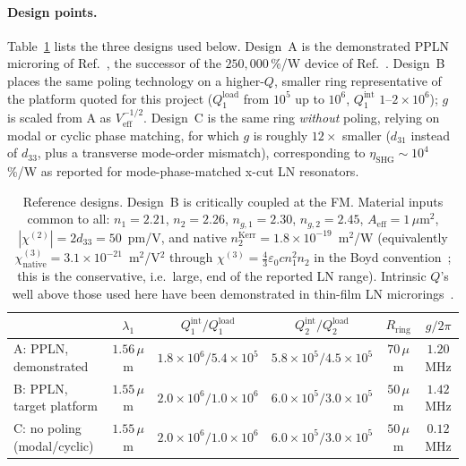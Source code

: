 \documentclass[11pt,a4paper]{article}
\newcommand{\eps}{\varepsilon}
\newcommand{\chitwo}{\chi^{(2)}}
\newcommand{\chithree}{\chi^{(3)}}
\newcommand{\Veff}{V_{\text{eff}}}
\newcommand{\Aeff}{A_{\text{eff}}}
\newcommand{\etanorm}{\eta_{\text{SHG}}}
\begin{document}
\paragraph{Design points.}  Table~\ref{tab:designs} lists the three
designs used below.  Design~A is the demonstrated PPLN microring of Ref.~\cite{Lu2020}, the
successor of the $250{,}000$\,\%/W device of Ref.~\cite{Lu2019}.  Design~B places the same poling technology on a
higher-$Q$, smaller ring representative of the platform quoted for this
project ($Q_1^{\text{load}}$ from $10^5$ up to $10^6$, $Q_1^{\text{int}}$
$1$--$2\times10^6$); $g$ is scaled from A as $\Veff^{-1/2}$.  Design~C is
the same ring \emph{without} poling, relying on modal or cyclic phase
matching, for which $g$ is roughly $12\times$ smaller
($d_{31}$ instead of $d_{33}$, plus a transverse mode-order mismatch),
corresponding to $\etanorm\sim10^4$\,\%/W as reported for
mode-phase-matched x-cut LN resonators.

\begin{table}[H]
\centering
\small
\begin{tabular}{lccccc}
\toprule
 & $\lambda_1$ & $Q_1^{\text{int}}/Q_1^{\text{load}}$
 & $Q_2^{\text{int}}/Q_2^{\text{load}}$ & $R_{\text{ring}}$ & $g/2\pi$ \\
\midrule
A: PPLN, demonstrated \cite{Lu2020} & $1.56\,\mu$m
   & $1.8\!\times\!10^6/5.4\!\times\!10^5$
   & $5.8\!\times\!10^5/4.5\!\times\!10^5$ & $70\,\mu$m & $1.20$ MHz \\
B: PPLN, target platform & $1.55\,\mu$m
   & $2.0\!\times\!10^6/1.0\!\times\!10^6$
   & $6.0\!\times\!10^5/3.0\!\times\!10^5$ & $50\,\mu$m & $1.42$ MHz \\
C: no poling (modal/cyclic) & $1.55\,\mu$m
   & $2.0\!\times\!10^6/1.0\!\times\!10^6$
   & $6.0\!\times\!10^5/3.0\!\times\!10^5$ & $50\,\mu$m & $0.12$ MHz \\
\bottomrule
\end{tabular}
\caption{Reference designs.  Design~B is critically coupled at the FM.
Material inputs common to all: $n_1=2.21$, $n_2=2.26$, $n_{g,1}=2.30$,
$n_{g,2}=2.45$, $\Aeff=1\,\mu$m$^2$, $|\chitwo|=2d_{33}=50$~pm/V, and
native $n_2^{\text{Kerr}}=1.8\times10^{-19}$~m$^2$/W (equivalently
$\chithree_{\text{native}}=3.1\times10^{-21}$~m$^2$/V$^2$ through
$\chithree=\tfrac43\eps_0cn_1^2n_2$ in the Boyd convention~\cite{Boyd};
this is the conservative, i.e.\ large, end of the reported LN range).
Intrinsic $Q$'s well above those used here have been demonstrated in
thin-film LN microrings~\cite{Zhang2017}.}
\label{tab:designs}
\end{table}
\end{document}
